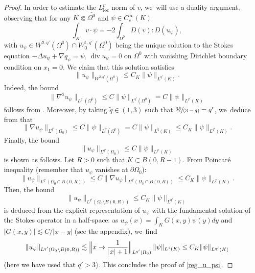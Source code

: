 \documentclass[JEP,XML,SOM,Unicode,NoEqCountersInSection,published]{cedram}
\newcommand{\spfrac}[2]{\sfrac{#1}{(#2)}}
\newcommand{\loc}{\mathrm{loc}}
\renewcommand{\div}{\operatorname{div}}
\theoremstyle{plain}
\theoremstyle{definition}
\let\pa\partial
\let\na\nabla
\begin{document}
\begin{proof}
In order to estimate the $L^p_{\loc}$ norm of $v$, we~will use a duality argument, observing that for any $K\Subset \overline{\Omega^0}$ and $\psi \in C^\infty_c(K)$
\[
\int_{K} v \cdot \psi = -2 \int_{\Omega^0} D (v): D (u_\psi),
\]
with $u_\psi \in W^{2,q'}(\Omega^0) \cap W^{1,q'}_0(\Omega^0)$ being the unique solution to the Stokes equation $-\Delta u_\psi+\nabla q_\psi=\psi $, $\div u_\psi=0$ on $\Omega^0$ with vanishing Dirichlet boundary condition on $x_1=0$. We claim that this solution satisfies
\begin{equation}\label{reg_u_psi}
\|u_\psi \|_{W^{2,q'}(\Omega^0)} \leq C_K \|\psi\|_{L^{q'}(K)}.
\end{equation}
Indeed, the bound
\[
\|\na^2 u_\psi\|_{L^{q'}(\Omega^0)} \le C \|\psi\|_{L^{q'}(\Omega^0)} = C \|\psi\|_{L^{q'}(K)}
\]
follows from \cite[Th.\,IV.3.2,\,(IV.3.30)]{Galdi}. Moreover, by taking $\tilde{q} \!\in\! (1,3)$ such that $\spfrac{3 \tilde q}{3-\tilde q} = q'$, we~deduce from \cite[Th.\,IV.3.2,\,(IV.3.31)]{Galdi} that
\[
\|\na u_\psi\|_{L^{q'}(\Omega_0)} \le C \|\psi\|_{L^{\tilde q}(\Omega^0)} = C \|\psi\|_{L^{\tilde q}(K)} \le C_K \|\psi\|_{L^{q'}(K)}.
\]
Finally, the bound
\[
\|u_\psi\|_{L^{q'}(\Omega_0)} \le C \|\psi\|_{L^{q'}(K)}
\]
is shown as follows. Let $R > 0$ such that $K \subset B(0,R-1)$. From Poincaré inequality (remember that $u_\psi$ vanishes at $\pa \Omega_0$):
\[
\|u_\psi\|_{L^{q'}(\Omega_0 \cap B(0,R))} \le C \|\na u_\psi\|_{L^{q'}(\Omega_0 \cap B(0,R))} \le C_K \|\psi\|_{L^{q'}(K)}.
\]
Then, the bound
\[
\|u_\psi\|_{L^{q'}(\Omega_0 \setminus B(0,R))} \le C_K \|\psi\|_{L^{q'}(K)}
\]
is deduced from the explicit representation of $u_\psi$ with the fundamental solution of the Stokes operator in a half-space: as $u_\psi(x) = \int_{K} G(x,y) \psi(y) dy$ and $|G(x,y)| \lesssim C/|x-y|$ (see the appendix), we~find
\[
\|u_\psi\|_{L^{q'}(\Omega_0 \setminus B(0,R))} \lesssim \Bigl\|x \rightarrow \frac{1}{|x|+1}\Bigr\|_{L^{q'}(\Omega_0)}\, \|\psi\|_{L^1(K)} \le C_K \|\psi\|_{L^{q'}(K)}
\]
(here we have used that $q' > 3$). This concludes the proof of \eqref{reg_u_psi}.


\end{proof}
\end{document}
